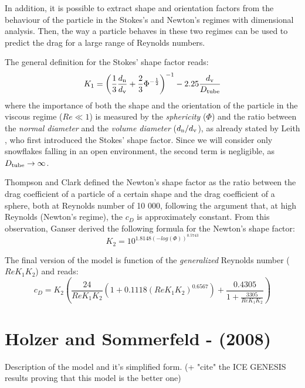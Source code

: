 		In addition, it is possible to extract shape and orientation factors	from the behaviour of the particle in the Stokes’s and Newton’s regimes with dimensional analysis. Then, the way a particle behaves in these two regimes can be used to predict the drag for a large range of Reynolds numbers.
		
		The general definition for the Stokes' shape factor reads:
		\begin{equation}
			K_1 = \left( \frac{1}{3} \frac{d_{\textup{n}}}{d_{\textup{v}}} + \frac{2}{3} \Phi^{-\frac{1}{2}} \right)^{-1} -2.25 \frac{d_{\textup{v}}}{D_{\textup{tube}}} 
		\end{equation}
		where the importance of both the shape and the orientation of the particle in the viscous regime ($ Re \ll 1 $) is measured by the \textit{sphericity} ($ \Phi $) and the ratio between the \textit{normal diameter} and the \textit{volume diameter} ($ d_{\textup{n}} / d_{\textup{v}} $), as already stated by Leith \cite{Leith-1987}, who first introduced the Stokes' shape factor.
		Since we will consider only snowflakes falling in an open environment, the second term is negligible, as $ D_{\textup{tube}} \rightarrow \infty $.
		
		Thompson and Clark \cite{ThompsonClark-1991} defined the Newton's shape factor as the ratio between the drag coefficient of a particle of a certain shape and the drag coefficient of a sphere, both at Reynolds number of 10 000, following the argument that, at high Reynolds (Newton's regime), the $ c_D $ is approximately constant.
		From this observation, Ganser derived the following formula for the Newton's shape factor:
		\begin{equation}
			K_2 = 10^{1.8148 (-log(\Phi))^{0.5743}}
		\end{equation}
		
		The final version of the model is function of the \textit{generalized} Reynolds number ($ Re K_1 K_2 $) and reads:
		\begin{equation}
			c_D = K_2 \left( \frac{24}{Re K_1 K_2} (1 + 0.1118 (Re K_1 K_2)^{0.6567}) + \frac{0.4305}{1 + \frac{3305}{Re K_1 K_2}}\right) 
		\end{equation}
	
	
	
	
	
	
	
	
	
	
	
	
	
				
	\section{Holzer and Sommerfeld - (2008)}
		Description of the model and it's simplified form. 
		(+ "cite" the ICE GENESIS results proving that this model is the better one)
		
